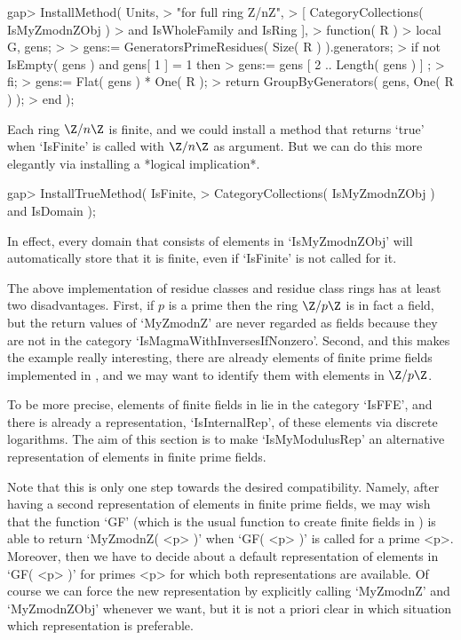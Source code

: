 \beginexample
gap> InstallMethod( Units,
>    "for full ring Z/nZ",
>    [     CategoryCollections( IsMyZmodnZObj )
>      and IsWholeFamily and IsRing ],
>    function( R )
>    local G, gens;
> 
>    gens:= GeneratorsPrimeResidues( Size( R ) ).generators;
>    if not IsEmpty( gens ) and gens[ 1 ] = 1 then
>      gens:= gens{ [ 2 .. Length( gens ) ] };
>    fi;
>    gens:= Flat( gens ) * One( R );
>    return GroupByGenerators( gens, One( R ) );
>    end );
\endexample

Each ring $\Z/n\Z$ is finite,
and we could install a method that returns `true' when `IsFinite' is
called with $\Z/n\Z$ as argument.
But we can do this more elegantly via installing a *logical implication*.

\beginexample
gap> InstallTrueMethod( IsFinite,
>    CategoryCollections( IsMyZmodnZObj ) and IsDomain );
\endexample

In effect, every domain that consists of elements in `IsMyZmodnZObj'
will automatically store that it is finite,
even if `IsFinite' is not called for it.



The above implementation of residue classes and residue class rings
has at least two disadvantages.
First, if $p$ is a prime then the ring $\Z/p\Z$ is in fact a field,
but the return values of `MyZmodnZ' are never regarded as fields because
they are not in the category `IsMagmaWithInversesIfNonzero'.
Second, and this makes the example really interesting,
there are already elements of finite prime fields implemented in {\GAP},
and we may want to identify them with elements in $\Z/p\Z$.

To be more precise,
elements of finite fields in {\GAP} lie in the category `IsFFE',
and there is already a representation, `IsInternalRep', of these elements
via discrete logarithms.
The aim of this section is to make `IsMyModulusRep' an alternative
representation of elements in finite prime fields.

Note that this is only one step towards the desired compatibility.
Namely, after having a second representation of elements in finite
prime fields, we may wish that the function `GF' (which is the usual
function to create finite fields in {\GAP}) is able to return
`MyZmodnZ( <p> )' when `GF( <p> )' is called for a prime <p>.
Moreover, then we have to decide about a default representation of
elements in `GF( <p> )' for primes <p> for which both representations are
available.
Of course we can force the new representation by explicitly calling
`MyZmodnZ' and `MyZmodnZObj' whenever we want, but it is not a priori
clear in which situation which representation is preferable.

